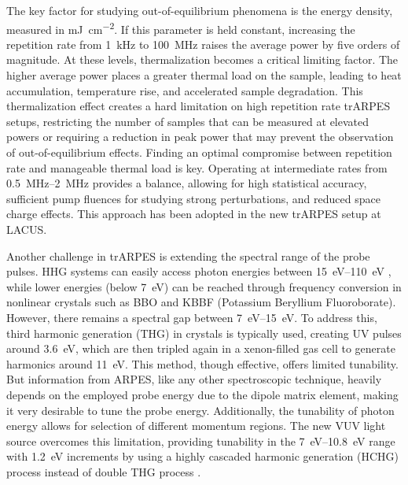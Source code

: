 The key factor for studying out-of-equilibrium phenomena is the energy density, measured in \unit{\milli\joule\per\centi\meter^2}.
If this parameter is held constant, increasing the repetition rate from \qty{1}{\kilo\hertz} to \qty{100}{\mega\hertz} raises the average power by five orders of magnitude.
At these levels, thermalization becomes a critical limiting factor.
The higher average power places a greater thermal load on the sample, leading to heat accumulation, temperature rise, and accelerated sample degradation.
This thermalization effect creates a hard limitation on high repetition rate trARPES setups, restricting the number of samples that can be measured at elevated powers or requiring a reduction in peak power that may prevent the observation of out-of-equilibrium effects.
Finding an optimal compromise between repetition rate and manageable thermal load is key.
Operating at intermediate rates from \qtyrange{0.5}{2}{\mega\hertz} provides a balance, allowing for high statistical accuracy, sufficient pump fluences for studying strong perturbations, and reduced space charge effects.
This approach has been adopted in the new trARPES setup at LACUS.

Another challenge in trARPES is extending the spectral range of the probe pulses.
HHG systems can easily access photon energies between \qtyrange{15}{110}{\electronvolt} \cite{chini_coherent_2014,weissenbilder_how_2022}, while lower energies (below \qty{7}{\electronvolt}) can be reached through frequency conversion in nonlinear crystals such as BBO and KBBF (Potassium Beryllium Fluoroborate).
However, there remains a spectral gap between \qtyrange{7}{15}{\electronvolt}.
To address this, third harmonic generation (THG) in crystals is typically used, creating UV pulses around \qty{3.6}{\electronvolt}, which are then tripled again in a xenon-filled gas cell to generate harmonics around \qty{11}{\electronvolt}.
This method, though effective, offers limited tunability.
But information from ARPES, like any other spectroscopic technique, heavily depends on the employed probe energy due to the dipole matrix element, making it very desirable to tune the probe energy.
Additionally, the tunability of photon energy allows for selection of different momentum regions.
The new VUV light source overcomes this limitation, providing tunability in the \qtyrange{7}{10.8}{\electronvolt} range with \qty{1.2}{\electronvolt} increments by using a highly cascaded harmonic generation (HCHG) process instead of double THG process \cite{couch_ultrafast_2020}.

